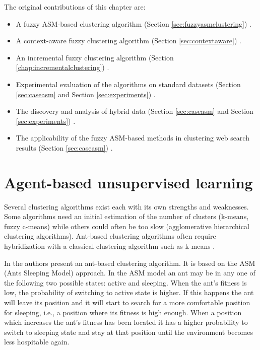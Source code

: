 The original contributions of this chapter are:

\begin{itemize}

\item A fuzzy ASM-based clustering algorithm (Section \ref{sec:fuzzyasmclustering}) \cite{Gaceanu10AnAdaptive, Gaceanu11ABio}.

\item A context-aware fuzzy clustering algorithm (Section \ref{sec:contextaware}) \cite{Gaceanu11AContext, Gaceanu11AFuzzy}.

\item An incremental fuzzy clustering algorithm (Section \ref{chap:incrementalclustering}) \cite{Gaceanu11AnIncremental}.

\item Experimental evaluation of the algorithms on standard datasets (Section \ref{sec:caseasm} and Section \ref{sec:experiments}) \cite{Gaceanu10AnAdaptive, Gaceanu11ABio, Gaceanu11AContext, Gaceanu11AFuzzy, Gaceanu11AnIncremental}.

\item The discovery and analysis of hybrid data (Section \ref{sec:caseasm} and Section \ref{sec:experiments}) \cite{Gaceanu11AContext, Gaceanu11AFuzzy, Gaceanu11AnIncremental}.

\item The applicability of the fuzzy ASM-based methods in clustering web search results (Section \ref{sec:caseasm}) \cite{Gaceanu10AnAdaptive, Gaceanu11ABio}.

\end{itemize}

\section{Agent-based unsupervised learning}
\label{sec:agentbased}
Several clustering algorithms exist each with its own strengths and weaknesses. Some algorithms need an initial estimation of the number of clusters (k-means, fuzzy c-means) while others could often be too slow (agglomerative hierarchical clustering algorithms). Ant-based clustering algorithms often require hybridization with a classical clustering algorithm such as k-means \cite{Schockaert04Fuzzy}. 

In \cite{Chen04AnAdaptive} the authors present an ant-based clustering algorithm. It is based on the ASM (Ants Sleeping Model) approach. 
In the ASM model an ant may be in any one of the following two possible states: active and sleeping.
When the ant's fitness is low, the probability of switching to active state is higher. If this happens the ant will leave its position and it will start to search for a more comfortable position for sleeping, i.e., a position where its fitness is high enough. When a position which increases the ant's fitness has been located it has a higher probability to switch to sleeping state and stay at that position until the environment becomes less hospitable again. 

